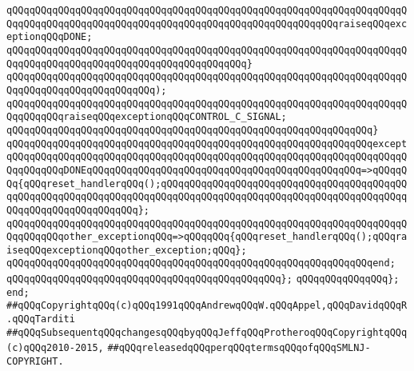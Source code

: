 \newline
\verb|qQQqqQQqqQQqqQQqqQQqqQQqqQQqqQQqqQQqqQQqqQQqqQQqqQQqqQQqqQQqqQQqqQQqqQQqqQQqqQQqqQQqqQQqqQQqqQQqqQQqqQQqqQQqqQQqqQQqqQQqqQQqqQQqraiseqQQqexceptionqQQqDONE;|\newline
\verb|qQQqqQQqqQQqqQQqqQQqqQQqqQQqqQQqqQQqqQQqqQQqqQQqqQQqqQQqqQQqqQQqqQQqqQQqqQQqqQQqqQQqqQQqqQQqqQQqqQQqqQQqqQQqqQQq}|\newline
\verb|qQQqqQQqqQQqqQQqqQQqqQQqqQQqqQQqqQQqqQQqqQQqqQQqqQQqqQQqqQQqqQQqqQQqqQQqqQQqqQQqqQQqqQQqqQQqqQQq);|\newline
\newline
\verb|qQQqqQQqqQQqqQQqqQQqqQQqqQQqqQQqqQQqqQQqqQQqqQQqqQQqqQQqqQQqqQQqqQQqqQQqqQQqqQQqraiseqQQqexceptionqQQqCONTROL_C_SIGNAL;|\newline
\verb|qQQqqQQqqQQqqQQqqQQqqQQqqQQqqQQqqQQqqQQqqQQqqQQqqQQqqQQqqQQqqQQq}|\newline
\verb|qQQqqQQqqQQqqQQqqQQqqQQqqQQqqQQqqQQqqQQqqQQqqQQqqQQqqQQqqQQqqQQqexcept|\newline
\verb|qQQqqQQqqQQqqQQqqQQqqQQqqQQqqQQqqQQqqQQqqQQqqQQqqQQqqQQqqQQqqQQqqQQqqQQqqQQqqQQqDONEqQQqqQQqqQQqqQQqqQQqqQQqqQQqqQQqqQQqqQQqqQQqqQQq=>qQQqqQQq{qQQqreset_handlerqQQq();qQQqqQQqqQQqqQQqqQQqqQQqqQQqqQQqqQQqqQQqqQQqqQQqqQQqqQQqqQQqqQQqqQQqqQQqqQQqqQQqqQQqqQQqqQQqqQQqqQQqqQQqqQQqqQQqqQQqqQQqqQQqqQQqqQQqqQQq};|\newline
\verb|qQQqqQQqqQQqqQQqqQQqqQQqqQQqqQQqqQQqqQQqqQQqqQQqqQQqqQQqqQQqqQQqqQQqqQQqqQQqqQQqother_exceptionqQQq=>qQQqqQQq{qQQqreset_handlerqQQq();qQQqraiseqQQqexceptionqQQqother_exception;qQQq};|\newline
\verb|qQQqqQQqqQQqqQQqqQQqqQQqqQQqqQQqqQQqqQQqqQQqqQQqqQQqqQQqqQQqqQQqend;|\newline
\verb|qQQqqQQqqQQqqQQqqQQqqQQqqQQqqQQqqQQqqQQqqQQqqQQq};|\newline
\verb|qQQqqQQqqQQqqQQq};|\newline
\verb|end;|\newline
\newline
\verb|##qQQqCopyrightqQQq(c)qQQq1991qQQqAndrewqQQqW.qQQqAppel,qQQqDavidqQQqR.qQQqTarditi|\newline
\verb|##qQQqSubsequentqQQqchangesqQQqbyqQQqJeffqQQqProtheroqQQqCopyrightqQQq(c)qQQq2010-2015,|\newline
\verb|##qQQqreleasedqQQqperqQQqtermsqQQqofqQQqSMLNJ-COPYRIGHT.|\newline


